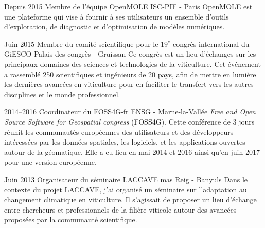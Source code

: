 \documentclass[]{cv-etienne}
\begin{document}
\begin{entrylist}
  \entry
  {Depuis 2015}
  {Membre de l'équipe OpenMOLE}
  {ISC-PIF - Paris}
  {OpenMOLE est une plateforme qui vise à fournir à ses utilisateurs un ensemble d'outils d'exploration, de diagnostic et d'optimisation de modèles numériques.}
\end{entrylist}
\begin{entrylist}
  \entry
  {Juin 2015}
  {Membre du comité scientifique pour le $19^{e}$ congrès international du GiESCO}
  {Palais des congrès - Gruissan}
  {Ce congrès est un lieu d'échanges sur les principaux domaines des sciences et technologies de la viticulture. Cet événement a rassemblé 250 scientifiques et ingénieurs de 20 pays, afin de mettre en lumière les dernières avancées en viticulture pour en faciliter le transfert vers les autres disciplines et le monde professionnel.}
\end{entrylist}
\begin{entrylist}
  \entry
  {2014--2016}
  {Coordinateur du FOSS4G-fr}
  {ENSG - Marne-la-Vallée}
  {\emph{Free and Open Source Software for Geospatial congress} (FOSS4G). Cette conférence de 3 jours réunit les communautés européennes des utilisateurs et des développeurs intéressées par les données spatiales, les logiciels, et les applications ouvertes autour de la géomatique. Elle a eu lieu en mai 2014 et 2016 ainsi qu'en juin 2017 pour une version européenne.}
\end{entrylist}
\begin{entrylist}
  \entry
  {Juin 2013}
  {Organisateur du séminaire LACCAVE}
  {mas Reig - Banyuls}
  {Dans le contexte du projet LACCAVE, j'ai organisé un séminaire sur l'adaptation au changement climatique en viticulture. Il s'agissait de proposer un lieu d'échange entre chercheurs et professionnels de la filière viticole autour des avancées proposées par la communauté scientifique.}
\end{entrylist}
\end{document}
